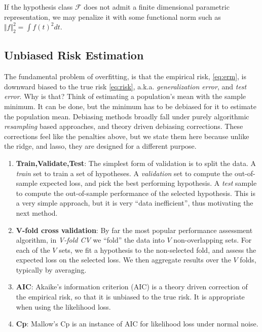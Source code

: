 \documentclass[]{book}
\providecommand{\tightlist}{%
  \setlength{\itemsep}{0pt}\setlength{\parskip}{0pt}}
\theoremstyle{definition}
\theoremstyle{definition}
\theoremstyle{remark}
\begin{document}
If the hypothesis class \(\mathcal{F}\) does not admit a finite
dimensional parametric representation, we may penalize it with some
functional norm such as \(\Vert f \Vert_2^2=\int f(t)^2 dt\).

\subsection{Unbiased Risk Estimation}\label{unbiased-risk-estimation}

The fundamental problem of overfitting, is that the empirical risk,
\eqref{eq:erm}, is downward biased to the true risk \eqref{eq:risk}, a.k.a.
\emph{generalization error}, and \emph{test error}. Why is that? Think
of estimating a population's mean with the sample minimum. It can be
done, but the minimum has to be debiased for it to estimate the
population mean. Debiasing methods broadly fall under purely algorithmic
\emph{resampling} based approaches, and theory driven debiasing
corrections. These corrections feel like the penalties above, but we
state them here because unlike the ridge, and lasso, they are designed
for a different purpose.

\begin{enumerate}
\def\labelenumi{\arabic{enumi}.}
\tightlist
\item
  \textbf{Train,Validate,Test}: The simplest form of validation is to
  split the data. A \emph{train} set to train a set of hypotheses. A
  \emph{validation} set to compute the out-of-sample expected loss, and
  pick the best performing hypothesis. A \emph{test} sample to compute
  the out-of-sample performance of the selected hypothesis. This is a
  very simple approach, but it is very ``data inefficient'', thus
  motivating the next method.
\item
  \textbf{V-fold cross validation}: By far the most popular performance
  assessment algorithm, in \emph{V-fold CV} we ``fold'' the data into
  \(V\) non-overlapping sets. For each of the \(V\) sets, we fit a
  hypothesis to the non-selected fold, and assess the expected loss on
  the selected loss. We then aggregate results over the \(V\) folds,
  typically by averaging.
\item
  \textbf{AIC}: Akaike's information criterion (AIC) is a theory driven
  correction of the empirical risk, so that it is unbiased to the true
  risk. It is appropriate when using the likelihood loss.
\item
  \textbf{Cp}: Mallow's Cp is an instance of AIC for likelihood loss
  under normal noise.
\end{enumerate}
\end{document}
